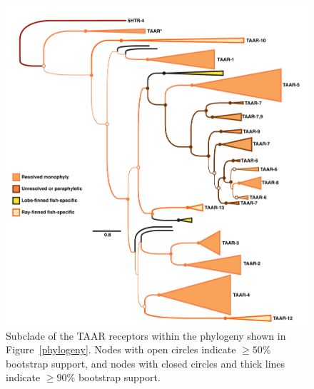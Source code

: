 \documentclass[fleqn,10pt]{wlpeerj}
\begin{document}
\begin{figure}[htbp]
	\centerline{\includegraphics[width=15cm]{figures/taar_phylogeny.pdf}}
	\caption{\label{taar_tree} Subclade of the TAAR receptors within the phylogeny shown in Figure~\ref{phylogeny}. Nodes with open circles indicate $\geq 50\%$ bootstrap support, and nodes with closed circles and thick lines indicate $\geq 90\%$ bootstrap support.}
\end{figure}
\end{document}
